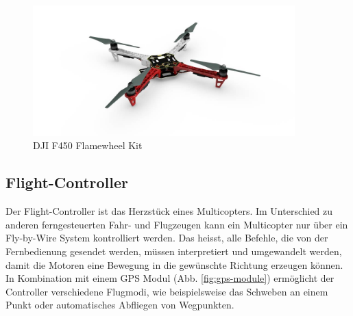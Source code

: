 \begin{figure}[h]
	\centering
	\includegraphics[width=0.9\textwidth] {images/hardware/f450.jpg}
	\caption{DJI F450 Flamewheel Kit}
	\label{fig:f450}
\end{figure}


\subsection{Flight-Controller}

Der \Gls{Flight-Controller} ist das Herzstück eines Multicopters. Im Unterschied zu anderen ferngesteuerten Fahr- und Flugzeugen kann ein Multicopter nur über ein Fly-by-Wire System kontrolliert werden. Das heisst, alle Befehle, die von der Fernbedienung gesendet werden, müssen interpretiert und umgewandelt werden, damit die Motoren eine Bewegung in die gewünschte Richtung erzeugen können. In Kombination mit einem GPS Modul (Abb. \ref{fig:gps-module}) ermöglicht der Controller verschiedene Flugmodi, wie beispielsweise das Schweben an einem Punkt oder automatisches Abfliegen von Wegpunkten.

